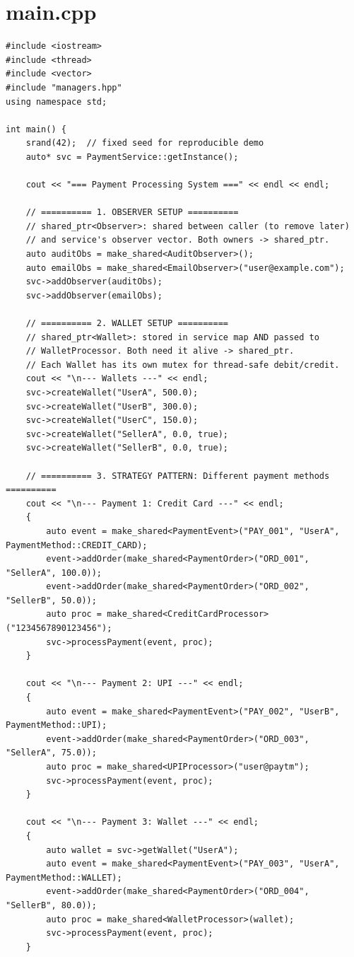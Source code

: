 \documentclass[11pt,a4paper]{article}
\begin{document}
\section{main.cpp}
\begin{lstlisting}[title={\texttt{main.cpp}}]
#include <iostream>
#include <thread>
#include <vector>
#include "managers.hpp"
using namespace std;

int main() {
    srand(42);  // fixed seed for reproducible demo
    auto* svc = PaymentService::getInstance();

    cout << "=== Payment Processing System ===" << endl << endl;

    // ========== 1. OBSERVER SETUP ==========
    // shared_ptr<Observer>: shared between caller (to remove later)
    // and service's observer vector. Both owners -> shared_ptr.
    auto auditObs = make_shared<AuditObserver>();
    auto emailObs = make_shared<EmailObserver>("user@example.com");
    svc->addObserver(auditObs);
    svc->addObserver(emailObs);

    // ========== 2. WALLET SETUP ==========
    // shared_ptr<Wallet>: stored in service map AND passed to
    // WalletProcessor. Both need it alive -> shared_ptr.
    // Each Wallet has its own mutex for thread-safe debit/credit.
    cout << "\n--- Wallets ---" << endl;
    svc->createWallet("UserA", 500.0);
    svc->createWallet("UserB", 300.0);
    svc->createWallet("UserC", 150.0);
    svc->createWallet("SellerA", 0.0, true);
    svc->createWallet("SellerB", 0.0, true);

    // ========== 3. STRATEGY PATTERN: Different payment methods ==========
    cout << "\n--- Payment 1: Credit Card ---" << endl;
    {
        auto event = make_shared<PaymentEvent>("PAY_001", "UserA", PaymentMethod::CREDIT_CARD);
        event->addOrder(make_shared<PaymentOrder>("ORD_001", "SellerA", 100.0));
        event->addOrder(make_shared<PaymentOrder>("ORD_002", "SellerB", 50.0));
        auto proc = make_shared<CreditCardProcessor>("1234567890123456");
        svc->processPayment(event, proc);
    }

    cout << "\n--- Payment 2: UPI ---" << endl;
    {
        auto event = make_shared<PaymentEvent>("PAY_002", "UserB", PaymentMethod::UPI);
        event->addOrder(make_shared<PaymentOrder>("ORD_003", "SellerA", 75.0));
        auto proc = make_shared<UPIProcessor>("user@paytm");
        svc->processPayment(event, proc);
    }

    cout << "\n--- Payment 3: Wallet ---" << endl;
    {
        auto wallet = svc->getWallet("UserA");
        auto event = make_shared<PaymentEvent>("PAY_003", "UserA", PaymentMethod::WALLET);
        event->addOrder(make_shared<PaymentOrder>("ORD_004", "SellerB", 80.0));
        auto proc = make_shared<WalletProcessor>(wallet);
        svc->processPayment(event, proc);
    }


\end{lstlisting}
\end{document}
